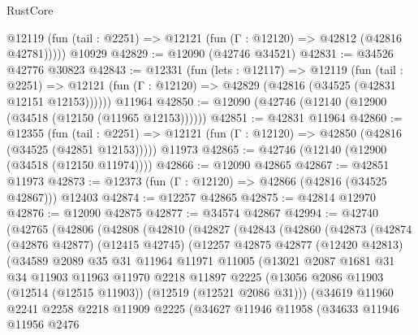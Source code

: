 \begin{lexlean}{RustCore}
\begin{coremodule}
      @12119 (fun (tail : @2251) => @12121 (fun (Γ : @12120) => @42812 (@42816 @42781)))))
    @10929
@42829 := @12090 (@42746 @34521)
@42831 := @34526 @42776 @30823
@42843 := @12331
    (fun (lets : @12117) =>
    @12119
      (fun (tail : @2251) =>
      @12121 (fun (Γ : @12120) => @42829 (@42816 (@34525 (@42831 @12151 @12153))))))
    @11964
@42850 := @12090 (@42746 (@12140 (@12900 (@34518 (@12150 (@11965 @12153))))))
@42851 := @42831 @11964
@42860 := @12355
    (fun (tail : @2251) => @12121 (fun (Γ : @12120) => @42850 (@42816 (@34525 (@42851 @12153)))))
    @11973
@42865 := @42746 (@12140 (@12900 (@34518 (@12150 @11974))))
@42866 := @12090 @42865
@42867 := @42851 @11973
@42873 := @12373 (fun (Γ : @12120) => @42866 (@42816 (@34525 @42867))) @12403
@42874 := @12257 @42865
@42875 := @42814 @12970
@42876 := @12090 @42875
@42877 := @34574 @42867
@42994 := @42740
    (@42765
      (@42806
        (@42808
          (@42810
            (@42827
              (@42843
                (@42860
                  (@42873
                    (@42874
                      (@42876 @42877)
                      (@12415 @42745)
                      (@12257
                        @42875
                        @42877
                        (@12420 @42813)
                        (@34589
                          @2089
                          @35
                          @31
                          @11964
                          @11971
                          @11005
                          (@13021
                            @2087
                            @1681
                            @31
                            @34
                            @11903
                            @11963
                            @11970
                            @2218
                            @11897
                            @2225
                            (@13056
                              @2086
                              @11903
                              (@12514 (@12515 @11903))
                              (@12519 (@12521 @2086 @31)))
                            (@34619
                              @11960
                              @2241
                              @2258
                              @2218
                              @11909
                              @2225
                              (@34627
                                @11946
                                @11958
                                (@34633
                                  @11946
                                  @11956
                                  @2476

\end{coremodule}
\end{lexlean}
